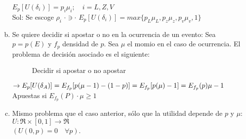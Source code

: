 \begin{enumerate}[(a)]
   $E_p[U(\delta_i)]=p_i\mu_i;\quad i=L,Z,V$\\
  
   Sol: Se escoge $\rho_i \,\, \cdot \ni \cdot \,\, E_p[U(\delta_i)]=max\{p_L\mu_L,p_z\mu_z,p_v\mu_v,1\}$
  
   \item Se quiere decidir si apostar o no en la ocurrencia de un evento: Sea $p=p(E)$ y $f_p$ densidad de $p$. Sea $\mu$ el momio en el caso de ocurrencia. El problema de decisión asociado es el siguiente:\\
 
 \begin{figure}[!ht]
 \caption{Decidir si apostar o no apostar}
 \end{figure}
 
 \newpage
  
   $\rightarrow E_p[U(\delta_A)]=E_{f_p}[p(\mu-1)-(1-p)]\\
   =E_{f_p}[p(\mu)-1]\\
   =E_{f_p}(p)\mu-1$\\

   Apuestas si $E_{f_p}(P)\cdot \mu \ge 1$
  
   \item Mismo problema que el caso anterior, sólo que la utilidad depende de $p$ y $\mu$: $U: \Re\times[0,1]\rightarrow\Re$\\
   $(U(0,p)=0\quad\forall p)$.\\
 

\end{enumerate}

